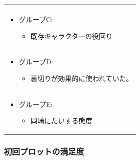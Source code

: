 \documentclass[a4j,12pt]{jsreport}
\begin{document}
\begin{tabularx}{12cm}{X}
\begin{minipage}{\linewidth}
   \end{minipage} \\
   \begin{minipage}{\linewidth}
      \vspace{0.5cm}
         \begin{itemize}[itemsep=0pt, parsep=2pt]
         \item グループC:
            \begin{itemize}[itemsep=0pt, parsep=2pt]
               \item 既存キャラクターの役回り
            \end{itemize}
         \end{itemize}
   \end{minipage} \\
   \begin{minipage}{\linewidth}
      \vspace{0.5cm}
         \begin{itemize}[itemsep=0pt, parsep=2pt]
         \item グループD:
            \begin{itemize}[itemsep=0pt, parsep=2pt]
               \item 裏切りが効果的に使われていた。
            \end{itemize}
         \end{itemize}
   \end{minipage} \\
   \begin{minipage}{\linewidth}
      \vspace{0.5cm}
         \begin{itemize}[itemsep=0pt, parsep=2pt]
         \item グループE:
            \begin{itemize}[itemsep=0pt, parsep=2pt]
               \item 岡崎にたいする態度
            \end{itemize}
         \end{itemize}
         \vspace{0.2cm}
   \end{minipage} \\
   \hline
\end{tabularx}

\subsubsection{初回プロットの満足度}
\end{document}
